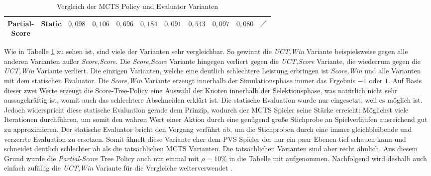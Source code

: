 \begin{table}[H]
{\begin{tabular}{|c|c|c|c|c|c|c|c|c|c|c|}
            \tiny \makecell{Partial-                                                                                                                                                                                                                                                                                                                                                              \\Score} &        Static & \cellcolor[HTML]{f9826f}$0{,}098$ & \cellcolor[HTML]{f98470}$0{,}106$ & \cellcolor[HTML]{c2da81}$0{,}696$ & \cellcolor[HTML]{fa9874}$0{,}184$ & \cellcolor[HTML]{f9806f}$0{,}091$ & \cellcolor[HTML]{f2e884}$0{,}543$ & \cellcolor[HTML]{f9826f}$0{,}097$ & \cellcolor[HTML]{f97d6e}$0{,}080$ & $\diagup$                         \\ \hline
        \end{tabular}}
    \vspace{3pt}
    \caption{Vergleich der \acs{MCTS} Policy und Evaluator Varianten}
    \label{tabelle:mcts-policy-eval-comparision}
\end{table}

Wie in Tabelle \ref{tabelle:mcts-policy-eval-comparision} zu sehen ist, sind viele der Varianten sehr vergleichbar. So gewinnt die \emph{\acs{UCT},Win} Variante beispielsweise gegen alle anderen Varianten außer \emph{Score,Score}. Die \emph{Score,Score} Variante hingegen verliert gegen die \emph{\acs{UCT},Score} Variante, die wiederrum gegen die \emph{\acs{UCT},Win} Variante verliert. Die einzigen Varianten, welche eine deutlich schlechtere Leistung erbringen ist \emph{Score,Win} und alle Varianten mit dem statischen Evaluator. Die \emph{Score,Win} Variante erzeugt innerhalb der Simulationsphase immer das Ergebnis $-1$ oder $1$. Auf Basis dieser zwei Werte erzeugt die Score-Tree-Policy eine Auswahl der Knoten innerhalb der Selektionsphase, was natürlich nicht sehr aussagekräftig ist, womit auch das schlechtere Abschneiden erklärt ist. Die statische Evaluation wurde nur eingesetzt, weil es möglich ist. Jedoch widerspricht diese statische Evaluation gerade dem Prinzip, wodurch der \ac{MCTS} Spieler seine Stärke erreicht: Möglichst viele Iterationen durchführen, um somit den wahren Wert einer Aktion durch eine genügend große Stichprobe an Spielverläufen ausreichend gut zu approximieren. Der statische Evaluator bricht den Vorgang verführt ab, um die Stichproben durch eine immer gleichbleibende und verzerrte Evaluation zu ersetzen. Somit ähnelt diese Variante eher dem \ac{PVS} Spieler der nur ein paar Ebenen tief schauen kann und schneidet deutlich schlechter ab als die tatsächlichen \ac{MCTS} Varianten. Die tatsächlichen Varianten sind aber recht ähnlich. Aus diesem Grund wurde die \emph{Partial-Score} Tree Policy auch nur einmal mit $\rho = 10\%$ in die Tabelle mit aufgenommen. Nachfolgend wird deshalb auch einfach zufällig die \emph{\acs{UCT},Win} Variante für die Vergleiche weiterverwendet .

